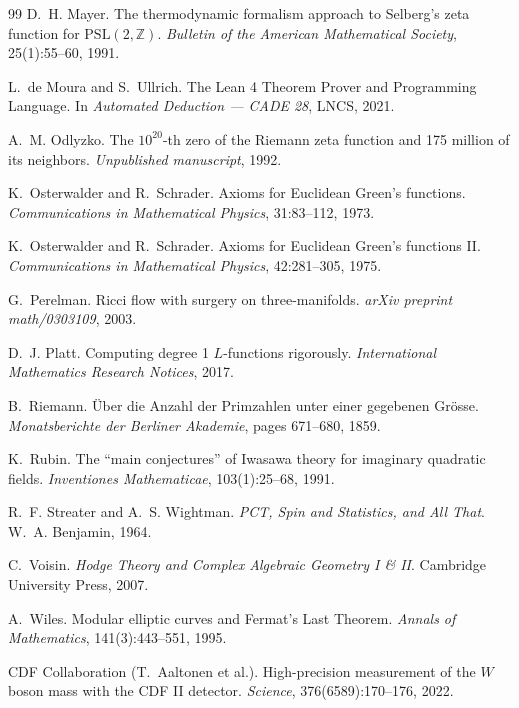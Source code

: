 \documentclass[11pt,a4paper]{amsart}
\theoremstyle{plain}
\theoremstyle{definition}
\begin{document}
\begin{thebibliography}{99}
D.~H. Mayer.
\newblock The thermodynamic formalism approach to Selberg's zeta function for $\mathrm{PSL}(2,\mathbb{Z})$.
\newblock \emph{Bulletin of the American Mathematical Society}, 25(1):55--60, 1991.

L.~de Moura and S.~Ullrich.
\newblock The Lean 4 Theorem Prover and Programming Language.
\newblock In \emph{Automated Deduction --- CADE 28}, LNCS, 2021.

A.~M. Odlyzko.
\newblock The $10^{20}$-th zero of the Riemann zeta function and 175 million of its neighbors.
\newblock \emph{Unpublished manuscript}, 1992.

K.~Osterwalder and R.~Schrader.
\newblock Axioms for Euclidean Green's functions.
\newblock \emph{Communications in Mathematical Physics}, 31:83--112, 1973.

K.~Osterwalder and R.~Schrader.
\newblock Axioms for Euclidean Green's functions II.
\newblock \emph{Communications in Mathematical Physics}, 42:281--305, 1975.

G.~Perelman.
\newblock Ricci flow with surgery on three-manifolds.
\newblock \emph{arXiv preprint math/0303109}, 2003.

D.~J. Platt.
\newblock Computing degree 1 $L$-functions rigorously.
\newblock \emph{International Mathematics Research Notices}, 2017.

B.~Riemann.
\newblock \"Uber die Anzahl der Primzahlen unter einer gegebenen Gr\"osse.
\newblock \emph{Monatsberichte der Berliner Akademie}, pages 671--680, 1859.

K.~Rubin.
\newblock The ``main conjectures'' of Iwasawa theory for imaginary quadratic fields.
\newblock \emph{Inventiones Mathematicae}, 103(1):25--68, 1991.

R.~F. Streater and A.~S. Wightman.
\newblock \emph{PCT, Spin and Statistics, and All That}.
\newblock W.~A. Benjamin, 1964.

C.~Voisin.
\newblock \emph{Hodge Theory and Complex Algebraic Geometry I \& II}.
\newblock Cambridge University Press, 2007.

A.~Wiles.
\newblock Modular elliptic curves and Fermat's Last Theorem.
\newblock \emph{Annals of Mathematics}, 141(3):443--551, 1995.

CDF Collaboration (T.~Aaltonen et al.).
\newblock High-precision measurement of the $W$ boson mass with the CDF II detector.
\newblock \emph{Science}, 376(6589):170--176, 2022.


\end{thebibliography}
\end{document}
